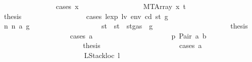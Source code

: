 \begin{isabellebody}
\ \ \ \ \ \ \ \ \ \ \ \ \ \ \isamarkupfalse%
\ {\isacharparenleft}{\kern0pt}cases\ x{}{\isacharparenright}{\kern0pt}\isanewline
\ \ \ \ \ \ \ \ \ \ \ \ \ \ \ \ \isamarkupfalse%
\ {\isacharparenleft}{\kern0pt}MTArray\ x\ t{\isacharparenright}{\kern0pt}\isanewline
\ \ \ \ \ \ \ \ \ \ \ \ \ \ \ \ \isamarkupfalse%
\ \isamarkupfalse%
\ {\isacharquery}{\kern0pt}thesis\isanewline
\ \ \ \ \ \ \ \ \ \ \ \ \ \ \ \ \isamarkupfalse%
\ {\isacharparenleft}{\kern0pt}cases\ {\isachardoublequoteopen}lexp\ lv\ env\ cd\ st{\isacharprime}{\kern0pt}{\isacharprime}{\kern0pt}\ g{\isacharprime}{\kern0pt}{\isachardoublequoteclose}{\isacharparenright}{\kern0pt}\isanewline
\ \ \ \ \ \ \ \ \ \ \ \ \ \ \ \ \ \ \isamarkupfalse%
\ n{}{\isacharcolon}{\kern0pt}\ {\isacharparenleft}{\kern0pt}n\ a\ g{\isacharprime}{\kern0pt}{\isacharprime}{\kern0pt}{\isacharparenright}{\kern0pt}\isanewline
\ \ \ \ \ \ \ \ \ \ \ \ \ \ \ \ \ \ \isamarkupfalse%
\ st{\isacharprime}{\kern0pt}{\isacharprime}{\kern0pt}{\isacharprime}{\kern0pt}\ \ {\isachardoublequoteopen}st{\isacharprime}{\kern0pt}{\isacharprime}{\kern0pt}{\isacharprime}{\kern0pt}\ {\isacharequal}{\kern0pt}\ st{\isacharprime}{\kern0pt}{\isacharprime}{\kern0pt}{\isasymlparr}gas\ {\isacharcolon}{\kern0pt}{\isacharequal}{\kern0pt}\ g{\isacharprime}{\kern0pt}{\isacharprime}{\kern0pt}{\isasymrparr}{\isachardoublequoteclose}\isanewline
\ \ \ \ \ \ \ \ \ \ \ \ \ \ \ \ \ \ \isamarkupfalse%
\ \isamarkupfalse%
\ {\isacharquery}{\kern0pt}thesis\isanewline
\ \ \ \ \ \ \ \ \ \ \ \ \ \ \ \ \ \ \isamarkupfalse%
\ {\isacharparenleft}{\kern0pt}cases\ a{\isacharparenright}{\kern0pt}\isanewline
\ \ \ \ \ \ \ \ \ \ \ \ \ \ \ \ \ \ \ \ \isamarkupfalse%
\ p{}{\isacharcolon}{\kern0pt}\ {\isacharparenleft}{\kern0pt}Pair\ a\ b{\isacharparenright}{\kern0pt}\isanewline
\ \ \ \ \ \ \ \ \ \ \ \ \ \ \ \ \ \ \ \ \isamarkupfalse%
\ \isamarkupfalse%
\ {\isacharquery}{\kern0pt}thesis\isanewline
\ \ \ \ \ \ \ \ \ \ \ \ \ \ \ \ \ \ \ \ \isamarkupfalse%
\ {\isacharparenleft}{\kern0pt}cases\ a{\isacharparenright}{\kern0pt}\isanewline
\ \ \ \ \ \ \ \ \ \ \ \ \ \ \ \ \ \ \ \ \ \ \isamarkupfalse%
\ {\isacharparenleft}{\kern0pt}LStackloc\ l{\isacharparenright}{\kern0pt}\isanewline
\ \ \ \ \ \ \ \ \ \ \ \ \ \ \ \ \ \ \ \ \ \ \isamarkupfalse%
\ \isamarkupfalse%

\end{isabellebody}
